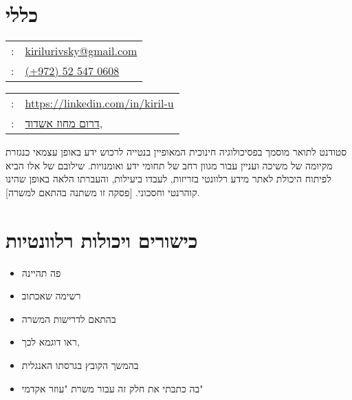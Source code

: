 \setRTL
\hspace{.25\textwidth}
\begin{minipage}[t]{.5\textwidth}
	\par{\par}
\end{minipage}
\section{כללי}
\unsetRTL
\setLTR
\begin{minipage}[t]{.5\linewidth}
	\begin{tabular}{rp{.75\linewidth}}
		\baselineskip=20pt
		\email{} : &\href{mailto:kirilurivsky@gmail.com}{kirilurivsky@gmail.com}\\
		\phone{} : &\href{tel:972525470608}{(+972) 52 547 0608}
	\end{tabular}
\end{minipage}
\begin{minipage}[t]{.5\linewidth}
	\begin{tabular}{rl}
		\linkedin{} : &\href{https://www.linkedin.com/in/kiril-u}{https://linkedin.com/in/kiril-u}\\
		\location{} : &\href{https://goo.gl/maps/MSacjpSy7vZSKykP7}{דרום מחוז אשדוד,}
	\end{tabular}
\end{minipage}	
\unsetLTR
\unsetRTL
\setRTL
\begin{minipage}[t]{1\linewidth}
	\vspace{0.25cm} %
	סטודנט לתואר מוסמך בפסיכולוגיה חינוכית המאופיין בנטייה לרכוש ידע באופן עצמאי כנגזרת מקיומה של משיכה ועניין עבור מגוון רחב של תחומי ידע ואומנויות.  שילובם של אלו הביא לפיתוח היכולת לאתר מידע רלוונטי בזריזות, לעבדו ביעילות, והעברתו הלאה באופן שהינו קוהרנטי וחסכוני. [פסקה זו משתנה בהתאם למשרה].
\end{minipage}

\section{כישורים ויכולות רלוונטיות}

\begin{itemize}
\item{ פה תהיינה}
\item{ רשימה שאכתוב}
\item{ בהתאם לדרישות המשרה}
\item{ ראו דוגמא לכך,}
\item{ בהמשך הקובץ בגרסתו האנגלית}
\item{ בה כתבתי את חלק זה עבור משרת "עוזר אקדמי"}
\end{itemize}

